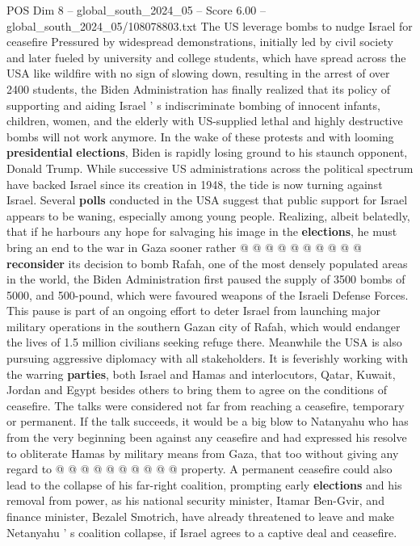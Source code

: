 \begin{textsample}{POS Dim 8 – global\_south\_2024\_05 – Score 6.00 – global\_south\_2024\_05/108078803.txt}  \label{ex:f8_pos_223}
The US leverage bombs to nudge Israel for ceasefire Pressured by widespread demonstrations, initially led by civil society and later fueled by university and college students, which have spread across the USA like wildfire with no sign of slowing down, resulting in the arrest of over 2400 students, the Biden Administration has finally realized that its policy of supporting and aiding Israel ' s indiscriminate bombing of innocent infants, children, women, and the elderly with US-supplied lethal and highly destructive bombs will not work anymore.
In the wake of these protests and with looming \textbf{presidential} \textbf{elections}, Biden is rapidly losing ground to his staunch opponent, Donald Trump.
While successive US administrations across the political spectrum have backed Israel since its creation in 1948, the tide is now turning against Israel.
Several \textbf{polls} conducted in the USA suggest that public support for Israel appears to be waning, especially among young people.
Realizing, albeit belatedly, that if he harbours any hope for salvaging his image in the \textbf{elections}, he must bring an end to the war in Gaza sooner rather @ @ @ @ @ @ @ @ @ @ \textbf{reconsider} its decision to bomb Rafah, one of the most densely populated areas in the world, the Biden Administration first paused the supply of 3500 bombs of 5000, and 500-pound, which were favoured weapons of the Israeli Defense Forces.
This pause is part of an ongoing effort to deter Israel from launching major military operations in the southern Gazan city of Rafah, which would endanger the lives of 1.5 million civilians seeking refuge there.
Meanwhile the USA is also pursuing aggressive diplomacy with all stakeholders.
It is feverishly working with the warring \textbf{parties}, both Israel and Hamas and interlocutors, Qatar, Kuwait, Jordan and Egypt besides others to bring them to agree on the conditions of ceasefire.
The talks were considered not far from reaching a ceasefire, temporary or permanent.
If the talk succeeds, it would be a big blow to Natanyahu who has from the very beginning been against any ceasefire and had expressed his resolve to obliterate Hamas by military means from Gaza, that too without giving any regard to @ @ @ @ @ @ @ @ @ @ property.
A permanent ceasefire could also lead to the collapse of his far-right coalition, prompting early \textbf{elections} and his removal from power, as his national security minister, Itamar Ben-Gvir, and finance minister, Bezalel Smotrich, have already threatened to leave and make Netanyahu ' s coalition collapse, if Israel agrees to a captive deal and ceasefire.

\end{textsample}
